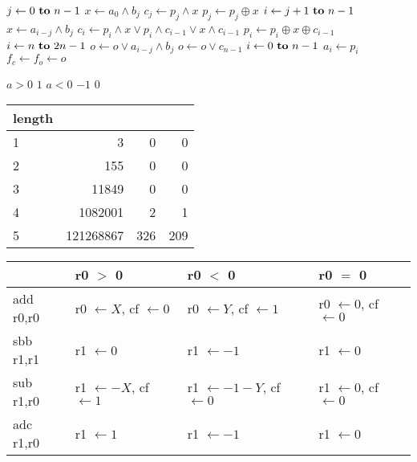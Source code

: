\documentclass{beamer}
\renewcommand{\gets}{\leftarrow}
\newcommand{\AND}{\land}
\newcommand{\IOR}{\lor}
\newcommand{\XOR}{\oplus}
\begin{document}
\begin{frame}
\begin{codebox}
\zi \For $j \gets 0 \To n-1$ \Do
\zi   $x \gets a_{0} \AND b_{j}$
\zi   $c_{j} \gets p_{j} \AND x$
\zi   $p_{j} \gets p_{j} \XOR x$
\zi   \For $i \gets j+1 \To n-1$ \Do
\zi     $x \gets a_{i-j} \AND b_{j}$
\zi     $c_{i} \gets p_{i} \AND x \IOR p_{i} \AND c_{i-1} \IOR x \AND c_{i-1}$
\zi     $p_{i} \gets p_{i} \XOR x \XOR c_{i-1}$ \End
\zi   \For $i \gets n \To 2n-1$ \Do
\zi     $o \gets o \IOR a_{i-j} \AND b_{j}$ \End
\zi   $o \gets o \IOR c_{n-1}$ \End
\zi \For $i \gets 0 \To n-1$ \Do
\zi   $a_{i} \gets p_{i}$ \End
\zi $f_c \gets f_o \gets o$
\end{codebox}
\end{frame}

\begin{frame}
\begin{codebox}
\zi \If $a > 0$ \Do
\zi   \Return $1$ \End
\zi \If $a < 0$ \Do
\zi   \Return $-1$ \End
\zi \Return $0$
\end{codebox}
\end{frame}

\begin{frame}
\begin{table}
\tiny
\begin{tabular}{l|rrr}
length & & & \\
\hline
1 &         3 &   0 &   0 \\
2 &       155 &   0 &   0 \\
3 &     11849 &   0 &   0 \\
4 &   1082001 &   2 &   1 \\
5 & 121268867 & 326 & 209 \\
\end{tabular}
\end{table}
\end{frame}

\begin{frame}
\begin{table}
\tiny
\begin{tabular}{l|lll}
& r0 $>$ 0
& r0 $<$ 0
& r0 $=$ 0 \\
\hline
add r0,r0
& r0 $\gets X$, cf $\gets 0$
& r0 $\gets Y$, cf $\gets 1$
& r0 $\gets 0$, cf $\gets 0$ \\
sbb r1,r1
& r1 $\gets 0$
& r1 $\gets -1$
& r1 $\gets 0$ \\
sub r1,r0
& r1 $\gets -X$, cf $\gets 1$
& r1 $\gets -1-Y$, cf $\gets 0$
& r1 $\gets 0$, cf $\gets 0$ \\
adc r1,r0
& r1 $\gets 1$
& r1 $\gets -1$
& r1 $\gets 0$ \\
\end{tabular}
\end{table}
\end{frame}
\end{document}
